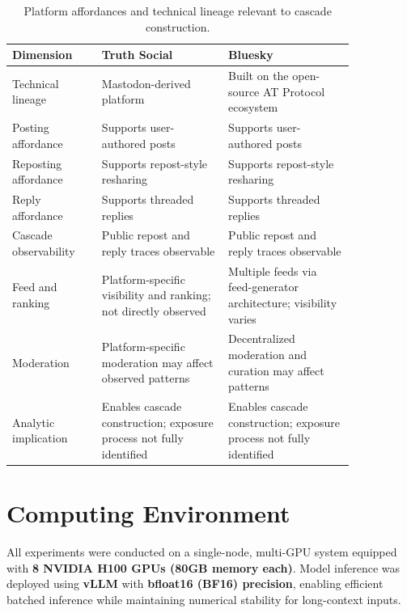 \documentclass[letterpaper]{article} %
\begin{document}
\begin{table}[!ht]
\centering
\small
\caption{Platform affordances and technical lineage relevant to cascade construction.}
\label{tab:platform_affordances}
\setlength{\tabcolsep}{4pt}
\begin{tabular}{p{0.22\linewidth}p{0.31\linewidth}p{0.31\linewidth}}
\toprule
\textbf{Dimension} & \textbf{Truth Social} & \textbf{Bluesky} \\
\midrule
Technical lineage
& Mastodon-derived platform
& Built on the open-source AT Protocol ecosystem \\

Posting affordance
& Supports user-authored posts
& Supports user-authored posts \\

Reposting affordance
& Supports repost-style resharing
& Supports repost-style resharing \\

Reply affordance
& Supports threaded replies
& Supports threaded replies \\

Cascade observability
& Public repost and reply traces observable
& Public repost and reply traces observable \\

Feed and ranking
& Platform-specific visibility and ranking; not directly observed
& Multiple feeds via feed-generator architecture; visibility varies \\

Moderation
& Platform-specific moderation may affect observed patterns
& Decentralized moderation and curation may affect patterns \\

Analytic implication
& Enables cascade construction; exposure process not fully identified
& Enables cascade construction; exposure process not fully identified \\
\bottomrule
\end{tabular}
\end{table}

\section{Computing Environment}

All experiments were conducted on a single-node, multi-GPU system equipped with \textbf{8 NVIDIA H100 GPUs (80GB memory each)}. Model inference was deployed using \textbf{vLLM} with \textbf{bfloat16 (BF16) precision}, enabling efficient batched inference while maintaining numerical stability for long-context inputs.
\end{document}
